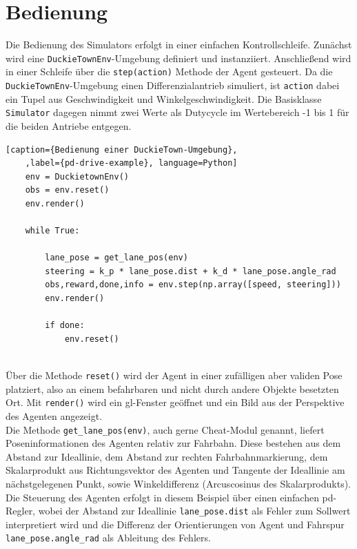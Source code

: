 \section{Bedienung}

Die Bedienung des Simulators erfolgt in einer einfachen Kontrollschleife. Zunächst wird eine \texttt{DuckieTownEnv}-Umgebung definiert und instanziiert. Anschließend wird in einer Schleife über die \texttt{step(action)} Methode der Agent gesteuert. Da die  \texttt{DuckieTownEnv}-Umgebung einen Differenzialantrieb simuliert, ist \texttt{action} dabei ein Tupel aus Geschwindigkeit und Winkelgeschwindigkeit. Die Basisklasse \texttt{Simulator} dagegen nimmt zwei Werte als Dutycycle im Wertebereich -1 bis 1 für die beiden Antriebe entgegen.

\begin{minipage}{\linewidth}
	\begin{lstlisting}[caption={Bedienung einer DuckieTown-Umgebung},
	,label={pd-drive-example}, language=Python]
	env = DuckietownEnv()
	obs = env.reset()
	env.render()
	
	while True:
		
		lane_pose = get_lane_pos(env)
		steering = k_p * lane_pose.dist + k_d * lane_pose.angle_rad
		obs,reward,done,info = env.step(np.array([speed, steering]))
		env.render()
		
		if done:
			env.reset()
	
	\end{lstlisting}
\end{minipage}

Über die Methode \texttt{reset()} wird der Agent in einer zufälligen aber validen Pose platziert, also an einem befahrbaren und nicht durch andere Objekte besetzten Ort. Mit \texttt{render()} wird ein \acs{gl}-Fenster geöffnet und ein Bild aus der Perspektive des Agenten angezeigt.\\

Die Methode \texttt{get\_lane\_pos(env)}, auch gerne \glqq Cheat-Modul\grqq{} genannt, liefert Poseninformationen des Agenten relativ zur Fahrbahn. Diese bestehen aus dem Abstand zur \glqq Ideallinie\grqq , dem Abstand zur rechten Fahrbahnmarkierung, dem Skalarprodukt aus Richtungsvektor des Agenten und Tangente der Ideallinie am nächstgelegenen Punkt, sowie Winkeldifferenz (Arcuscosinus des Skalarprodukts).\\

Die Steuerung des Agenten erfolgt in diesem Beispiel über einen einfachen \acs{pd}-Regler, wobei der Abstand zur Ideallinie \texttt{lane\_pose.dist} als Fehler zum Sollwert interpretiert wird und die Differenz der Orientierungen von Agent und Fahrspur \texttt{lane\_pose.angle\_rad} als Ableitung des Fehlers.\\


